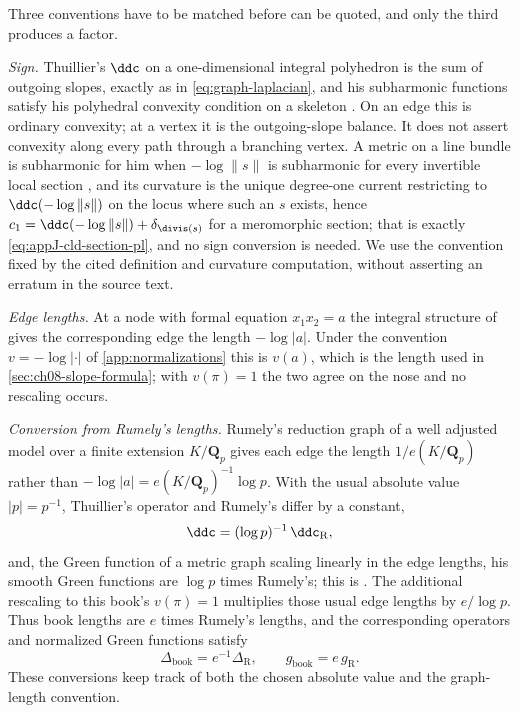\begin{remark}
\label{rem:ch08-thuillier-normalization}
Three conventions have to be matched before \cite{Thu05} can be quoted, and
only the third produces a factor.

\emph{Sign.}  Thuillier's $\ddc$ on a one-dimensional integral polyhedron is
the sum of outgoing slopes, exactly as in \eqref{eq:graph-laplacian}, and his
subharmonic functions satisfy his polyhedral convexity condition on a skeleton
\cite[Rem.~3.1.7 and Prop.~3.4.6]{Thu05}.  On an edge this is ordinary
convexity; at a vertex it is the outgoing-slope balance.  It does not assert
convexity along every path through a branching vertex.  A metric on a line bundle is
subharmonic for him when $-\log\|s\|$ is subharmonic for every invertible
local section \cite[Def.~3.4.17]{Thu05}, and its curvature is the unique
degree-one current restricting to $\ddc(-\log\|s\|)$ on the locus where such
an $s$ exists, hence $c_1=\ddc(-\log\|s\|)+\delta_{\divis(s)}$ for a
meromorphic section; that is exactly
\eqref{eq:appJ-cld-section-pl}, and no sign conversion is needed.  We use
the convention fixed by the cited definition and curvature computation,
without asserting an erratum in the source text.

\emph{Edge lengths.}  At a node with formal equation $x_1x_2=a$ the integral
structure of \cite[\S3.6.3]{Thu05} gives the corresponding edge the length
$-\log|a|$.  Under the convention $v=-\log|\cdot|$ of
\cref{app:normalizations} this is $v(a)$, which is the length used in
\cref{sec:ch08-slope-formula}; with $v(\pi)=1$ the two agree on the nose and
no rescaling occurs.

\emph{Conversion from Rumely's lengths.}  Rumely's reduction graph of a well adjusted
model over a finite extension $K/\mathbf Q_p$ gives each edge the length
$1/e(K/\mathbf Q_p)$ rather than $-\log|a|=e(K/\mathbf Q_p)^{-1}\log p$.
With the usual absolute value $|p|=p^{-1}$, Thuillier's operator and
Rumely's differ by a constant,
\[
   \ddc=(\log p)^{-1}\,\ddc_{\mathrm R},
\]
and, the Green function of a metric graph scaling linearly in the edge
lengths, his smooth Green functions are $\log p$ times Rumely's; this is
\cite[\S5.1]{Thu05}.  The additional rescaling to this book's
$v(\pi)=1$ multiplies those usual edge lengths by $e/\log p$.  Thus book
lengths are $e$ times Rumely's lengths, and the corresponding operators
and normalized Green functions satisfy
\[
 \Delta_{\mathrm{book}}=e^{-1}\Delta_{\mathrm R},\qquad
 g_{\mathrm{book}}=e\,g_{\mathrm R}.
\]
These conversions keep track of both the chosen absolute value and the
graph-length convention.
\end{remark}

